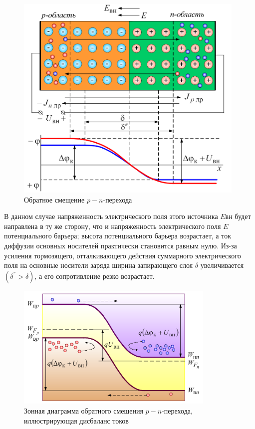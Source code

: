     \begin{figure}[h]
    	\centering
    	\includegraphics[height=10cm]{img/17} 
    	\captionsetup{font=footnotesize}
    	\caption{Обратное смещение \(p-n\)-перехода} 
    \end{figure}
    
     \par В данном случае напряженность электрического поля этого источника \(E\)вн будет направлена в ту же сторону, что и напряженность электрического поля \(E\) потенциального барьера; высота потенциального барьера возрастает, а ток диффузии основных носителей практически становится равным нулю. Из-за усиления тормозящего, отталкивающего действия суммарного электрического поля на основные носители заряда ширина запирающего слоя $\delta$ увеличивается $(\delta^{''} > \delta)$, а его сопротивление резко возрастает.
     
     \begin{figure}[h]
     	\centering
     	\includegraphics[height=6cm]{img/18} 
     	\captionsetup{font=footnotesize}
     	\caption{Зонная диаграмма обратного смещения \(p-n\)-перехода, иллюстрирующая дисбаланс токов} 
     \end{figure}
     
